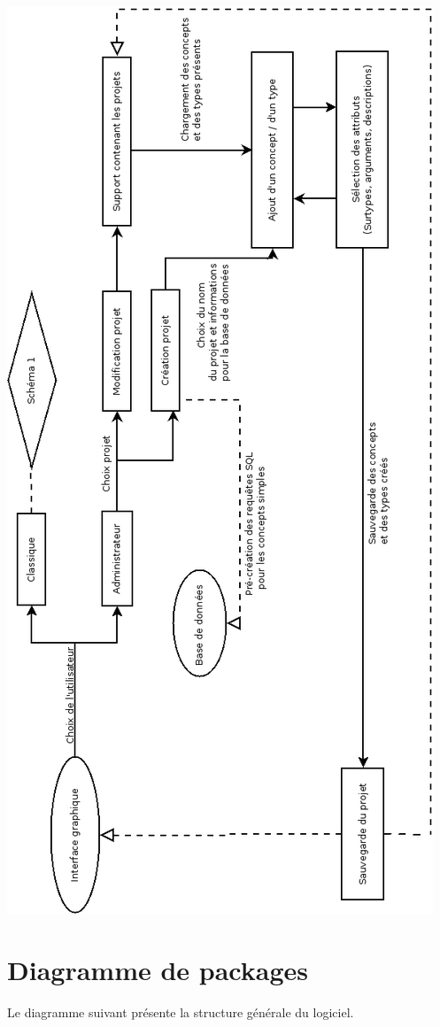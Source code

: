 \documentclass[12pt]{report}
\begin{document}
	\includegraphics[scale=0.53]{FonctionnementAdministrateur.png}
	

	



\section{Diagramme de packages}
Le diagramme suivant présente la structure générale du logiciel.
\end{document}
